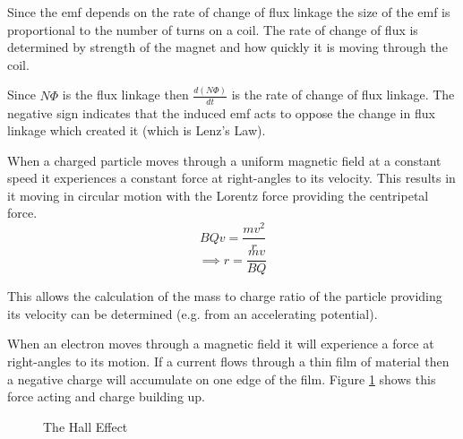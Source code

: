 \documentclass[main.tex]{subfiles}
\begin{document}

Since the emf depends on the rate of change of flux linkage the size of the emf is proportional to the number of turns on a coil. The rate of change of flux is determined by strength of the magnet and how quickly it is moving through the coil.


Since $N\Phi$ is the flux linkage then $\frac{d(N\Phi)}{dt}$ is the rate of change of flux linkage. The negative sign indicates that the induced emf acts to oppose the change in flux linkage which created it (which is Lenz's Law).


When a charged particle moves through a uniform magnetic field at a constant speed it experiences a constant force at right-angles to its velocity. This results in it moving in circular motion with the Lorentz force providing the centripetal force.
\[ BQv = \frac{mv^2}{r} \]
\[\implies r = \frac{mv}{BQ} \]

This allows the calculation of the mass to charge ratio of the particle providing its velocity can be determined (e.g. from an accelerating potential).


When an electron moves through a magnetic field it will experience a force at right-angles to its motion. If a current flows through a thin film of material then a negative charge will accumulate on one edge of the film. Figure \ref{halleffect} shows this force acting and charge building up.

\begin{figure}[h]
  \begin{center}
  \end{center}
  \caption{The Hall Effect}
  \label{halleffect}
\end{figure}
\end{document}
